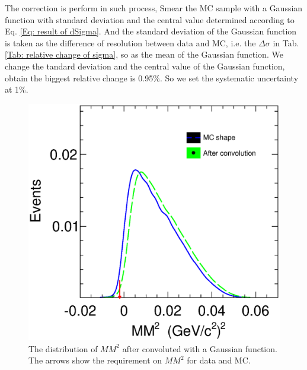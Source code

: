 The correction is perform in such process,  Smear the MC sample with a
Gaussian function with standard deviation and the central value
determined according to Eq. \ref{Eq: result of dSigma}. And the
standard deviation of the Gaussian function is taken as the difference
of resolution between data and MC, i.e. the $\Delta \sigma$ in Tab.
\ref{Tab: relative change of sigma}, so as the mean of the Gaussian
function.  We change the tandard deviation and the central value of the
Gaussian function, obtain the biggest relative change is 0.95\%. So we
set the systematic uncertainty at 1\%.
    
\begin{figure}[htbp]
    \centering
    \includegraphics[width = 8 cm]{section/append/fig/Cov_MM.eps}
    \caption{The distribution of $MM^{2}$ after convoluted with a Gaussian function. The arrows show the requirement on $MM^{2}$ for data and MC.}
    \label{Fig: Covolution gaussian}
\end{figure}

